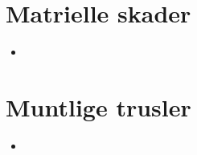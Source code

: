 	\section{Matrielle skader} 
		\begin{itemize}
			\item
		\end{itemize}
	\section{Muntlige trusler}
		\begin{itemize}
			\item
		\end{itemize}
